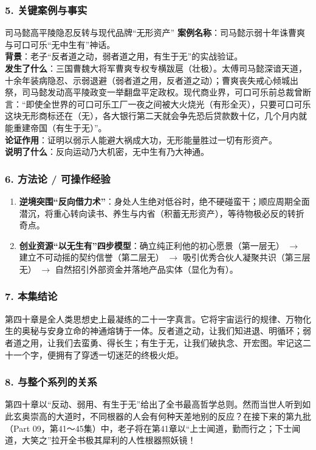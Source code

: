 \subsubsection{5. 关键案例与事实}
\begin{CaseBox}{司马懿高平陵隐忍反转与现代品牌“无形资产”}
\textbf{案例名称}：司马懿示弱十年诛曹爽与可口可乐“无中生有”神话。\\
\textbf{背景}：老子“反者道之动，弱者道之用，有生于无”的实战验证。\\
\textbf{发生了什么}：三国曹魏大将军曹爽专权专横跋扈（壮极）。太傅司马懿深谙天道，十余年装病隐忍、示弱退避（弱者道之用，反者道之动）；曹爽丧失戒心倾城出祭，司马懿发动高平陵政变一举翻盘平定政权。现代商业界，可口可乐前总裁曾断言：“即使全世界的可口可乐工厂一夜之间被大火烧光（有形全灭），只要可口可乐这块无形商标还在（无），各大银行第二天就会争先恐后贷款数十亿，几个月内就能重建帝国（有生于无）”。\\
\textbf{论证作用}：证明以弱示人能避大祸成大功，无形能量胜过一切有形资产。\\
\textbf{说明了什么}：反向运动乃大机密，无中生有乃大神通。
\end{CaseBox}

\subsubsection{6. 方法论 / 可操作经验}
\begin{enumerate}
    \item \textbf{逆境突围“反向借力术”}：身处人生绝对低谷时，绝不硬碰蛮干；顺应周期全面潜沉，将重心转向读书、养生与内省（积蓄无形资产），等待物极必反的转折奇点。
    \item \textbf{创业资源“以无生有”四步模型}：确立纯正利他的初心愿景（第一层无） $\rightarrow$ 建立不可动摇的契约信誉（第二层无） $\rightarrow$ 吸引优秀合伙人凝聚共识（第三层无） $\rightarrow$ 自然招引外部资金并落地产品实体（显化为有）。
\end{enumerate}

\subsubsection{7. 本集结论}
第四十章是全人类思想史上最凝练的二十一字真言。它将宇宙运行的规律、万物化生的奥秘与安身立命的神通熔铸于一体。反者道之动，让我们知进退、明循环；弱者道之用，让我们去蛮勇、得长生；有生于无，让我们破执念、开宏图。牢记这二十一个字，便拥有了穿透一切迷茫的终极火炬。

\subsubsection{8. 与整个系列的关系}
第四十章以“反动、弱用、有生于无”给出了全书最高哲学总则。然而当世人听到如此玄奥崇高的大道时，不同根器的人会有何种天差地别的反应？在接下来的第九批（Part 09，第41～45集）中，老子将在第41章以“上士闻道，勤而行之；下士闻道，大笑之”拉开全书极其犀利的人性根器照妖镜！